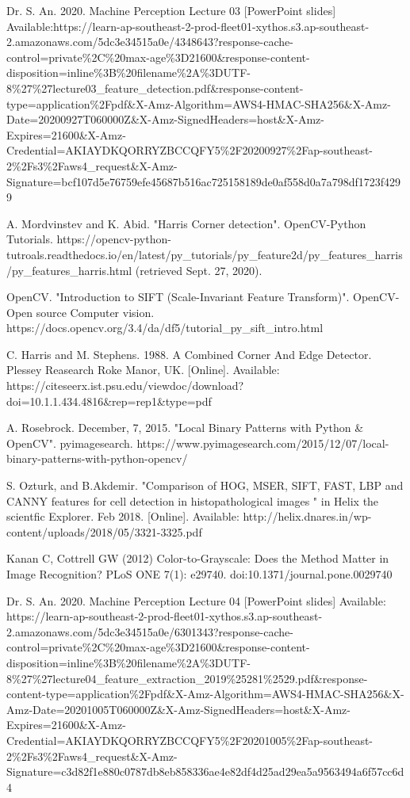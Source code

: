 \documentclass[conference]{IEEEtran}
\begin{document}
\newpage
\clearpage
\begin{thebibliography}{00}
 Dr. S. An. 2020. Machine Perception Lecture 03 [PowerPoint slides] Available:https://learn-ap-southeast-2-prod-fleet01-xythos.s3.ap-southeast-2.amazonaws.com/5dc3e34515a0e/4348643?response-cache-control=private\%2C\%20max-age\%3D21600\&response-content-disposition=inline\%3B\%20filename\%2A\%3DUTF-8\%27\%27lecture03\_feature\_detection.pdf\&response-content-type=application\%2Fpdf\&X-Amz-Algorithm=AWS4-HMAC-SHA256\&X-Amz-Date=20200927T060000Z\&X-Amz-SignedHeaders=host\&X-Amz-Expires=21600\&X-Amz-Credential=AKIAYDKQORRYZBCCQFY5\%2F20200927\%2Fap-southeast-2\%2Fs3\%2Faws4\_request\&X-Amz-Signature=bcf107d5e76759efe45687b516ac725158189de0af558d0a7a798df1723f4299

A. Mordvinstev and K. Abid. "Harris Corner detection". OpenCV-Python Tutorials. https://opencv-python-tutroals.readthedocs.io/en/latest/py\_tutorials/py\_feature2d/py\_features\_harris/py\_features\_harris.html (retrieved Sept. 27, 2020).

OpenCV. "Introduction to SIFT (Scale-Invariant Feature Transform)". OpenCV-Open source Computer vision. https://docs.opencv.org/3.4/da/df5/tutorial\_py\_sift\_intro.html

C. Harris and M. Stephens. 1988. A Combined Corner And Edge Detector. Plessey Reasearch Roke Manor, UK. [Online]. Available: https://citeseerx.ist.psu.edu/viewdoc/download?doi=10.1.1.434.4816\&rep=rep1\&type=pdf

A. Rosebrock. December, 7, 2015. "Local Binary Patterns with Python \& OpenCV". pyimagesearch. https://www.pyimagesearch.com/2015/12/07/local-binary-patterns-with-python-opencv/

 S. Ozturk, and B.Akdemir. "Comparison of HOG, MSER, SIFT, FAST, LBP and CANNY features for cell detection in histopathological images " in Helix the scientfic Explorer. Feb 2018. [Online]. Available: http://helix.dnares.in/wp-content/uploads/2018/05/3321-3325.pdf

 Kanan C, Cottrell GW (2012) Color-to-Grayscale: Does the Method Matter in Image Recognition? PLoS ONE 7(1): e29740. doi:10.1371/journal.pone.0029740

 Dr. S. An. 2020. Machine Perception Lecture 04 [PowerPoint slides] Available: https://learn-ap-southeast-2-prod-fleet01-xythos.s3.ap-southeast-2.amazonaws.com/5dc3e34515a0e/6301343?response-cache-control=private\%2C\%20max-age\%3D21600\&response-content-disposition=inline\%3B\%20filename\%2A\%3DUTF-8\%27\%27lecture04\_feature\_extraction\_2019\%25281\%2529.pdf\&response-content-type=application\%2Fpdf\&X-Amz-Algorithm=AWS4-HMAC-SHA256\&X-Amz-Date=20201005T060000Z\&X-Amz-SignedHeaders=host\&X-Amz-Expires=21600\&X-Amz-Credential=AKIAYDKQORRYZBCCQFY5\%2F20201005\%2Fap-southeast-2\%2Fs3\%2Faws4\_request\&X-Amz-Signature=c3d82f1e880c0787db8eb858336ae4e82df4d25ad29ea5a9563494a6f57cc6d4



\end{thebibliography}
\end{document}
